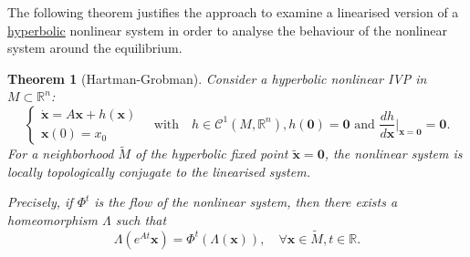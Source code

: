 \documentclass[hidelinks,a4paper, 11pt]{article}
\theoremstyle{plain}
\newtheorem{theorem}{Theorem}
\theoremstyle{break}
\theoremstyle{plain}
\theoremstyle{definition}
\begin{document}
The following theorem justifies the approach to examine a linearised version of a \underline{hyperbolic} nonlinear system in order to analyse the behaviour of the nonlinear system around the equilibrium.

\begin{framed}
\begin{theorem}[Hartman-Grobman]
	Consider a hyperbolic nonlinear IVP in $M \subset \mathbb R^n$:
	\[
		\begin{cases}
			\mathbf{\dot x} = A \mathbf x + h(\mathbf x) \\
			\mathbf{x} (0) = x_0 
		\end{cases} \quad \text{with} \quad h \in \mathcal C^1(M, \mathbb R^n), h(\mathbf 0) = \mathbf 0 \text{ and } \frac{d h}{d \mathbf x} \Bigg\vert_{\mathbf x = \mathbf 0} = \mathbf 0.
	\]
	For a neighborhood $\tilde M$ of the hyperbolic fixed point $\mathbf{\tilde x} = \mathbf 0$, the nonlinear system is locally topologically conjugate to the linearised system.
	
	Precisely, if $\Phi^t$ is the flow of the nonlinear system, then there exists a homeomorphism $\Lambda$ such that
	\[
		\Lambda(e^{At}\mathbf x) = \Phi^t(\Lambda(\mathbf x)), \quad \forall \mathbf x \in \tilde M, t \in \mathbb R.
	\]
\end{theorem}
\end{framed}
\end{document}
